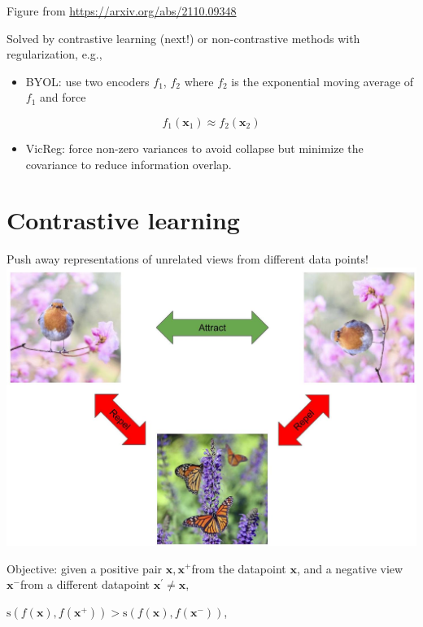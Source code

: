 \documentclass[10pt]{article}
\begin{document}
Figure from \href{https://arxiv.org/abs/2110.09348}{https://arxiv.org/abs/2110.09348}

Solved by contrastive learning (next!) or non-contrastive methods with regularization, e.g.,

\begin{itemize}
  \item BYOL: use two encoders $f_{1}$, $f_{2}$ where $f_{2}$ is the exponential moving average of $f_{1}$ and force
\end{itemize}

$$
f_{1}\left(\mathbf{x}_{1}\right) \approx f_{2}\left(\mathbf{x}_{2}\right)
$$

\begin{itemize}
  \item VicReg: force non-zero variances to avoid collapse but minimize the covariance to reduce information overlap.
\end{itemize}

\section*{Contrastive learning}
Push away representations of unrelated views from different data points!
\includegraphics[max width=\textwidth, center]{2024_01_08_7c14f4867d7823fc5a52g-12}

Objective: given a positive pair $\mathbf{x}, \mathbf{x}^{+}$from the datapoint $\mathbf{x}$, and a negative view $\mathbf{x}^{-}$from a different datapoint $\mathbf{x}^{\prime} \neq \mathbf{x}$,

$\mathrm{s}\left(f(\mathbf{x}), f\left(\mathbf{x}^{+}\right)\right)>\mathrm{s}\left(f(\mathbf{x}), f\left(\mathbf{x}^{-}\right)\right)$,
\end{document}
